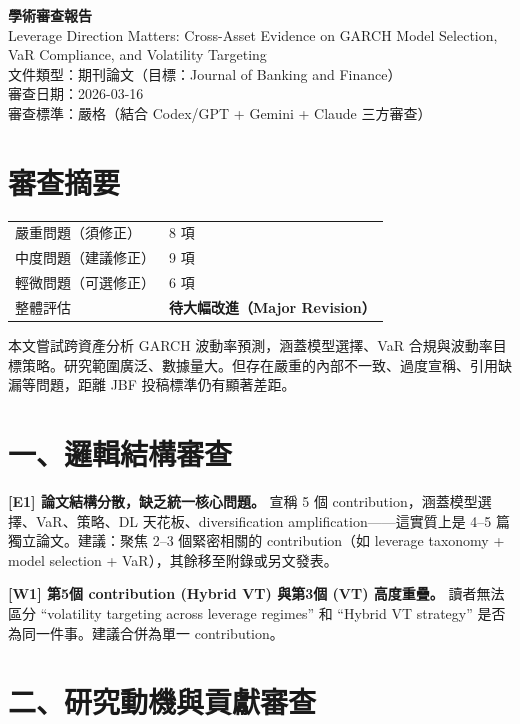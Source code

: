 \documentclass[12pt,a4paper]{article}
\begin{document}
\begin{center}
{\Large\bfseries 學術審查報告}\\[0.5em]
{\large Leverage Direction Matters: Cross-Asset Evidence on GARCH Model Selection, VaR Compliance, and Volatility Targeting}\\[0.5em]
{\normalsize 文件類型：期刊論文（目標：Journal of Banking and Finance）}\\
{\normalsize 審查日期：2026-03-16}\\
{\normalsize 審查標準：嚴格（結合 Codex/GPT + Gemini + Claude 三方審查）}
\end{center}

\section*{審查摘要}

\begin{tabular}{ll}
\textcolor{errorred}{嚴重問題（須修正）} & 8 項 \\
\textcolor{warncolor}{中度問題（建議修正）} & 9 項 \\
輕微問題（可選修正） & 6 項 \\
整體評估 & \textbf{待大幅改進（Major Revision）} \\
\end{tabular}

\bigskip
本文嘗試跨資產分析 GARCH 波動率預測，涵蓋模型選擇、VaR 合規與波動率目標策略。研究範圍廣泛、數據量大。但存在嚴重的內部不一致、過度宣稱、引用缺漏等問題，距離 JBF 投稿標準仍有顯著差距。

\section*{一、邏輯結構審查}

\textcolor{errorred}{\textbf{[E1] 論文結構分散，缺乏統一核心問題。}} 宣稱 5 個 contribution，涵蓋模型選擇、VaR、策略、DL 天花板、diversification amplification——這實質上是 4--5 篇獨立論文。建議：聚焦 2--3 個緊密相關的 contribution（如 leverage taxonomy + model selection + VaR），其餘移至附錄或另文發表。

\textcolor{warncolor}{\textbf{[W1] 第5個 contribution (Hybrid VT) 與第3個 (VT) 高度重疊。}} 讀者無法區分 ``volatility targeting across leverage regimes'' 和 ``Hybrid VT strategy'' 是否為同一件事。建議合併為單一 contribution。

\section*{二、研究動機與貢獻審查}
\end{document}
